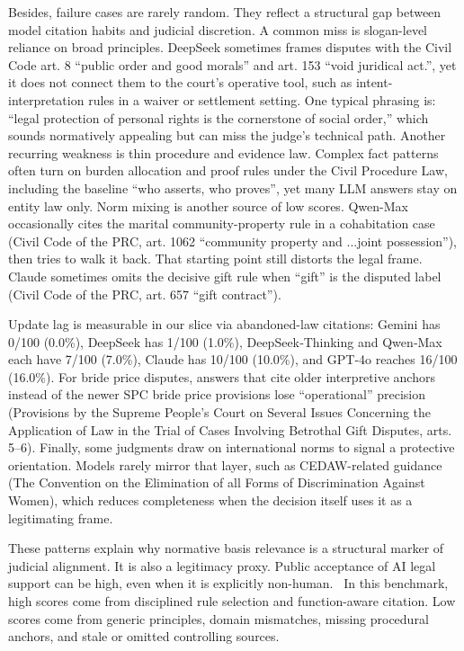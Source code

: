 \documentclass[pdflatex,sn-mathphys-ay]{sn-jnl}%
\theoremstyle{thmstyleone}%
\theoremstyle{thmstyletwo}%
\theoremstyle{thmstylethree}%
\begin{document}
Besides, failure cases are rarely random. They reflect a structural gap between model citation habits and judicial discretion. A common miss is slogan-level reliance on broad principles. DeepSeek sometimes frames disputes with the Civil Code art. 8 ``public order and good morals'' and art. 153 ``void juridical act.'', yet it does not connect them to the court's operative tool, such as intent-interpretation rules in a waiver or settlement setting. One typical phrasing is: ``legal protection of personal rights is the cornerstone of social order,'' which sounds normatively appealing but can miss the judge's technical path. Another recurring weakness is thin procedure and evidence law. Complex fact patterns often turn on burden allocation and proof rules under the Civil Procedure Law, including the baseline ``who asserts, who proves'', yet many LLM answers stay on entity law only. Norm mixing is another source of low scores. Qwen-Max occasionally cites the marital community-property rule in a cohabitation case (Civil Code of the PRC, art. 1062 ``community property and ...joint possession''), then tries to walk it back. That starting point still distorts the legal frame. Claude sometimes omits the decisive gift rule when ``gift'' is the disputed label (Civil Code of the PRC, art. 657 ``gift contract'').

Update lag is measurable in our slice via abandoned-law citations: Gemini has 0/100 (0.0\%), DeepSeek has 1/100 (1.0\%), DeepSeek‑Thinking and Qwen‑Max each have 7/100 (7.0\%), Claude has 10/100 (10.0\%), and GPT‑4o reaches 16/100 (16.0\%). For bride price disputes, answers that cite older interpretive anchors instead of the newer SPC bride price provisions lose ``operational'' precision (Provisions by the Supreme People's Court on Several Issues Concerning the Application of Law in the Trial of Cases Involving Betrothal Gift Disputes, arts. 5--6). Finally, some judgments draw on international norms to signal a protective orientation. Models rarely mirror that layer, such as CEDAW-related guidance (The Convention on the Elimination of all Forms of Discrimination Against Women), which reduces completeness when the decision itself uses it as a legitimating frame.

These patterns explain why normative basis relevance is a structural marker of judicial alignment. It is also a legitimacy proxy. Public acceptance of AI legal support can be high, even when it is explicitly non-human.~\cite{flanagan_rule_2025} In this benchmark, high scores come from disciplined rule selection and function-aware citation. Low scores come from generic principles, domain mismatches, missing procedural anchors, and stale or omitted controlling sources.
\end{document}
